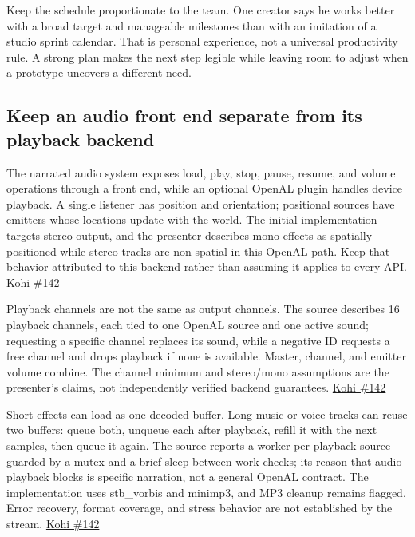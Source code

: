 Keep the schedule proportionate to the team. One creator says he works better with a broad target and manageable milestones than with an imitation of a studio sprint calendar. That is personal experience, not a universal productivity rule. A strong plan makes the next step legible while leaving room to adjust when a prototype uncovers a different need.

\subsection{Keep an audio front end separate from its playback backend}\label{05-engine-i-ch009-keep-an-audio-front-end-separate-from-its-playback-backend}

\hypertarget{05-engine-i-ch009-keep-an-audio-front-end-separate-from-its-playback-backend}{}

The narrated audio system exposes load, play, stop, pause, resume, and volume operations through a front end, while an optional OpenAL plugin handles device playback. A single listener has position and orientation; positional sources have emitters whose locations update with the world. The initial implementation targets stereo output, and the presenter describes mono effects as spatially positioned while stereo tracks are non-spatial in this OpenAL path. Keep that behavior attributed to this backend rather than assuming it applies to every API. \href{https://www.youtube.com/watch?v=xb23Y9o7tP4}{Kohi \#142}

Playback channels are not the same as output channels. The source describes 16 playback channels, each tied to one OpenAL source and one active sound; requesting a specific channel replaces its sound, while a negative ID requests a free channel and drops playback if none is available. Master, channel, and emitter volume combine. The channel minimum and stereo/mono assumptions are the presenter's claims, not independently verified backend guarantees. \href{https://www.youtube.com/watch?v=xb23Y9o7tP4}{Kohi \#142}

Short effects can load as one decoded buffer. Long music or voice tracks can reuse two buffers: queue both, unqueue each after playback, refill it with the next samples, then queue it again. The source reports a worker per playback source guarded by a mutex and a brief sleep between work checks; its reason that audio playback blocks is specific narration, not a general OpenAL contract. The implementation uses stb\_vorbis and minimp3, and MP3 cleanup remains flagged. Error recovery, format coverage, and stress behavior are not established by the stream. \href{https://www.youtube.com/watch?v=xb23Y9o7tP4}{Kohi \#142}

